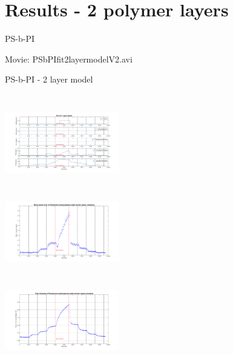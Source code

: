 \documentclass[10pt]{beamer}
\begin{document}
	\section{Results - 2 polymer layers}
	
\begin{frame}{PS-b-PI}
\begin{center}
	\huge Movie: PSbPIfit2layermodelV2.avi
\end{center}
\end{frame}

\begin{frame}{PS-b-PI - 2 layer model}
\begin{columns}[t]
\centering
\includegraphics[width=5cm,height=3.5cm]{Results_2layer_PSbPI.png}\\
\centering
\includegraphics[width=5cm,height=4cm]{MSE_2layer_PSbPI.png}\\
\includegraphics[width=5cm,height=3.5cm]{total_thickness_2layer_PSbPI.png}
\end{columns}
\end{frame}
\end{document}
